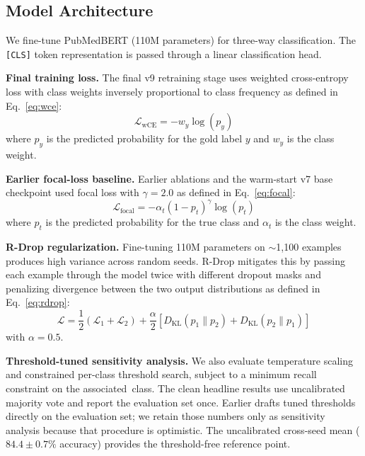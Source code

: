 \documentclass[sn-basic,pdflatex]{sn-jnl}
\newcommand{\RunInHeading}[1]{\par\smallskip\noindent\textbf{#1}\enspace\ignorespaces}
\newcommand{\ClassLabel}[1]{\mbox{\textup{#1}}}
\newcommand{\associated}{\ClassLabel{associated}}
\begin{document}
\subsection{Model Architecture}
\label{sec:model}

We fine-tune PubMedBERT \citep{gu2021pubmedbert} (110M parameters) for three-way classification.
The \texttt{[CLS]} token representation is passed through a linear classification head.

\RunInHeading{Final training loss.}
The final v9 retraining stage uses weighted cross-entropy loss with class weights inversely proportional to class frequency as defined in Eq.~\eqref{eq:wce}:
\begin{equation}
\label{eq:wce}
  \mathcal{L}_{\text{wCE}} = -w_y \log(p_y)
\end{equation}
where $p_y$ is the predicted probability for the gold label $y$ and $w_y$ is the class weight.

\RunInHeading{Earlier focal-loss baseline.}
Earlier ablations and the warm-start v7 base checkpoint used focal loss \citep{lin2017focal} with $\gamma = 2.0$ as defined in Eq.~\eqref{eq:focal}:
\begin{equation}
\label{eq:focal}
  \mathcal{L}_{\text{focal}} = -\alpha_t (1 - p_t)^\gamma \log(p_t)
\end{equation}
where $p_t$ is the predicted probability for the true class and $\alpha_t$ is the class weight.

\RunInHeading{R-Drop regularization.}
Fine-tuning 110M parameters on ${\sim}$1,100 examples produces high variance across random seeds.
R-Drop \citep{wu2021rdrop} mitigates this by passing each example through the model twice with different dropout masks and penalizing divergence between the two output distributions as defined in Eq.~\eqref{eq:rdrop}:
\begin{equation}
\label{eq:rdrop}
  \mathcal{L} = \frac{1}{2}(\mathcal{L}_1 + \mathcal{L}_2) + \frac{\alpha}{2} \left[D_{\text{KL}}(p_1 \| p_2) + D_{\text{KL}}(p_2 \| p_1)\right]
\end{equation}
with $\alpha = 0.5$.

\RunInHeading{Threshold-tuned sensitivity analysis.}
We also evaluate temperature scaling \citep{guo2017calibration} and constrained per-class threshold search, subject to a minimum recall constraint on the \associated\ class.
The clean headline results use uncalibrated majority vote and report the evaluation set once.
Earlier drafts tuned thresholds directly on the evaluation set; we retain those numbers only as sensitivity analysis because that procedure is optimistic.
The uncalibrated cross-seed mean ($84.4 \pm 0.7\%$ accuracy) provides the threshold-free reference point.
\end{document}
